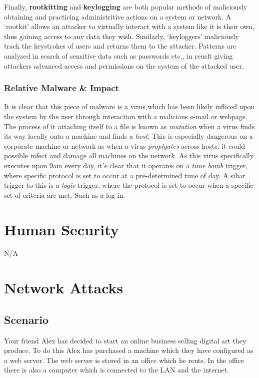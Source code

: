 \documentclass[11pt, english]{article}
\begin{document}
	Finally, \textbf{rootkitting} and \textbf{keylogging} are both popular methods of maliciously obtaining and practicing administritive actions on a system or network. A `rootkit' allows an attacker to virtually interact with a system like it is their own, thus gaining access to any data they wish. Similarly, `keyloggers' maliciously track the keystrokes of users and returns them to the attacker. Patterns are analysed in search of sensitive data such as passwords etc., in reuslt giving attackers advanced access and permissions on the system of the attacked user.

		\subsubsection{Relative Malware \& Impact}

	It is clear that this piece of malware is a virus which has been likely infliced upon the system by the user through interaction with a malicious e-mail or webpage. The process of it attaching itself to a file is known as \textit{mutation} when a virus finds its way locally onto a machine and finds a \textit{host}. This is especially dangerous on a corporate machine or network as when a virus \textit{propigates} across hosts, it could possible infect and damage all machines on the network. As this virus specifically executes upon 9am every day, it's clear that it operates on a \textit{time bomb} trigger, where specific protocol is set to occur at a pre-determined time of day. A siliar trigger to this is a \textit{logic} trigger, where the protocol is set to occur when a specific set of criteria are met. Such as a log-in.

\newpage

\section{Human Security}

	N/A

\newpage

\section{Network Attacks}

	\subsection{Scenario}

	Your friend Alex has decided to start an online business selling digital art they produce. To do this Alex has purchased a machine which they have configured as a web server. The web server is stored in an office which he rents. In the office there is also a computer which is connected to the LAN and the internet.\\
\end{document}
